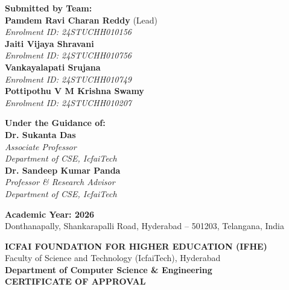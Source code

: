 \documentclass[12pt,a4paper,oneside]{report}
\theoremstyle{definition}
\begin{document}
\begin{titlepage}
    \begin{minipage}{0.48\textwidth}
        \begin{flushleft} \large
            \textbf{Submitted by Team:}\\[0.2cm]
            \textbf{Pamdem Ravi Charan Reddy} (Lead)\\
            \textit{Enrolment ID: 24STUCHH010156}\\[0.15cm]
            \textbf{Jaiti Vijaya Shravani}\\
            \textit{Enrolment ID: 24STUCHH010756}\\[0.15cm]
            \textbf{Vankayalapati Srujana}\\
            \textit{Enrolment ID: 24STUCHH010749}\\[0.15cm]
            \textbf{Pottipothu V M Krishna Swamy}\\
            \textit{Enrolment ID: 24STUCHH010207}
        \end{flushleft}
    \end{minipage}
    \hfill
    \begin{minipage}{0.48\textwidth}
        \begin{flushright} \large
            \textbf{Under the Guidance of:}\\[0.2cm]
            \textbf{Dr. Sukanta Das}\\
            \textit{Associate Professor}\\
            \textit{Department of CSE, IcfaiTech}\\[0.4cm]
            \textbf{Dr. Sandeep Kumar Panda}\\
            \textit{Professor \& Research Advisor}\\
            \textit{Department of CSE, IcfaiTech}
        \end{flushright}
    \end{minipage}
    
    \vfill
    {\large \textbf{Academic Year: 2026}}\\[0.1cm]
    {\normalsize Donthanapally, Shankarapalli Road, Hyderabad -- 501203, Telangana, India}
\end{titlepage}

\newpage
\thispagestyle{plain}
\begin{center}
    {\Large \textbf{ICFAI FOUNDATION FOR HIGHER EDUCATION (IFHE)}}\\[0.2cm]
    {\large Faculty of Science and Technology (IcfaiTech), Hyderabad}\\[0.2cm]
    {\textbf{Department of Computer Science \& Engineering}}\\[1.5cm]
    
    {\LARGE \textbf{CERTIFICATE OF APPROVAL}}\\[1.0cm]
\end{center}
\end{document}
